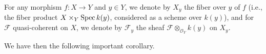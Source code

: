 For any morphism $f : X \to Y$ and $y \in Y$, we denote by $X_y$ the fiber
over $y$ of $f$ (i.e., the fiber product $X \times_Y \operatorname{Spec} k(y)$, considered
as a scheme over $k(y)$), and for $\mathcal{F}$ quasi-coherent on $X$, we
denote by $\mathcal{F}_y$ the sheaf
$\mathcal{F} \otimes_{\mathcal{O}_Y} k(y)$ on $X_y$.

We have then the following important corollary.
